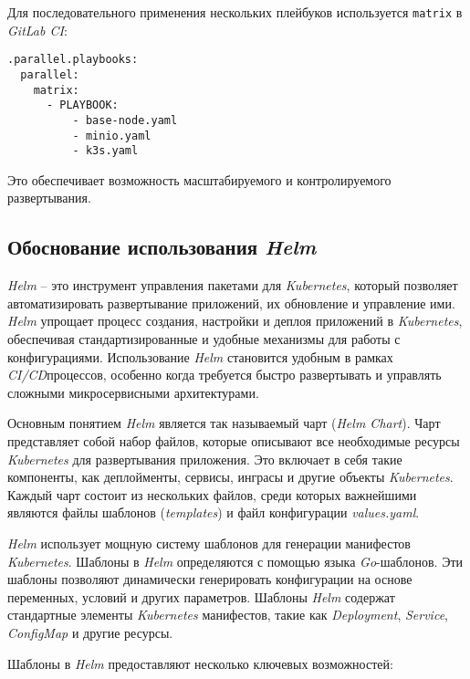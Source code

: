 Для последовательного применения нескольких плейбуков используется \lstinline{matrix} в \textit{GitLab CI}:

\begin{lstlisting}
.parallel.playbooks:
  parallel:
    matrix:
      - PLAYBOOK:
          - base-node.yaml
          - minio.yaml
          - k3s.yaml
\end{lstlisting}

Это обеспечивает возможность масштабируемого и контролируемого развертывания.


\subsection{Обоснование использования \textit{Helm}}

\textit{Helm} -- это инструмент управления пакетами для \textit{Kubernetes}, который позволяет автоматизировать развертывание приложений, их обновление и управление ими. \textit{Helm} упрощает процесс создания, настройки и деплоя приложений в \textit{Kubernetes}, обеспечивая стандартизированные и удобные механизмы для работы с конфигурациями. Использование \textit{Helm} становится удобным в рамках \textit{CI/CD}процессов, особенно когда требуется быстро развертывать и управлять сложными микросервисными архитектурами.

Основным понятием \textit{Helm} является так называемый чарт (\textit{Helm Chart}). Чарт представляет собой набор файлов, которые описывают все необходимые ресурсы \textit{Kubernetes} для развертывания приложения. Это включает в себя такие компоненты, как деплойменты, сервисы, инграсы и другие объекты \textit{Kubernetes}. Каждый чарт состоит из нескольких файлов, среди которых важнейшими являются файлы шаблонов (\textit{templates}) и файл конфигурации \textit{values.yaml}.

\textit{Helm} использует мощную систему шаблонов для генерации манифестов \textit{Kubernetes}. Шаблоны в \textit{Helm} определяются с помощью языка \textit{Go}-шаблонов. Эти шаблоны позволяют динамически генерировать конфигурации на основе переменных, условий и других параметров. Шаблоны \textit{Helm} содержат стандартные элементы \textit{Kubernetes} манифестов, такие как \textit{Deployment}, \textit{Service}, \textit{ConfigMap} и другие ресурсы. 

Шаблоны в \textit{Helm} предоставляют несколько ключевых возможностей:

